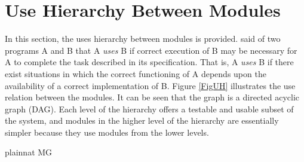\documentclass[12pt]{article}
\begin{document}
\section{Use Hierarchy Between Modules} \label{SecUse}

In this section, the uses hierarchy between modules is
provided. \citet{Parnas1978} said of two programs A and B that A {\em uses} B if
correct execution of B may be necessary for A to complete the task described in
its specification. That is, A {\em uses} B if there exist situations in which
the correct functioning of A depends upon the availability of a correct
implementation of B.  Figure \ref{FigUH} illustrates the use relation between
the modules. It can be seen that the graph is a directed acyclic graph
(DAG). Each level of the hierarchy offers a testable and usable subset of the
system, and modules in the higher level of the hierarchy are essentially simpler
because they use modules from the lower levels.



 {plainnat}
 {MG}
\end{document}
